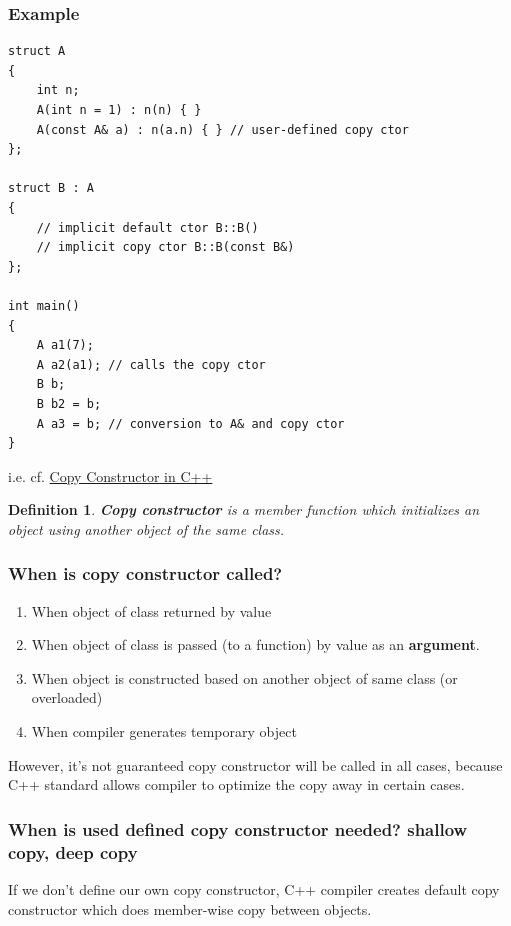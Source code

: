 \documentclass[10pt]{amsart}
\newtheorem{definition}{Definition}
\begin{document}
\begin{multicols*}{2}
\subsubsection{Example}  

\begin{lstlisting}
struct A
{
	int n;
	A(int n = 1) : n(n) { }
	A(const A& a) : n(a.n) { } // user-defined copy ctor
};

struct B : A
{
	// implicit default ctor B::B()
	// implicit copy ctor B::B(const B&)
};

int main()
{
	A a1(7);
	A a2(a1); // calls the copy ctor
	B b;
	B b2 = b;
	A a3 = b; // conversion to A& and copy ctor  
}
\end{lstlisting}  

i.e. cf. \href{http://www.geeksforgeeks.org/copy-constructor-in-cpp/}{Copy Constructor in C++}

\begin{definition}
	\textbf{Copy constructor} is a member function which initializes an object using another object of the same class.  
\end{definition}

\subsubsection{When is copy constructor called? } 
\begin{enumerate}
\item When object of class returned by value 
\item When object of class is passed (to a function) by value as an \textbf{argument}.  
\item When object is constructed based on another object of same class  (or overloaded)  
\item When compiler generates temporary object  
\end{enumerate}


However, it's not guaranteed copy constructor will be called in all cases, because C++ standard allows compiler to optimize the copy away in certain cases.  

\subsubsection{When is used defined copy constructor needed?  shallow copy, deep copy}  

If we don't define our own copy constructor, C++ compiler creates default copy constructor which does member-wise copy between objects.  


\end{multicols*}
\end{document}
